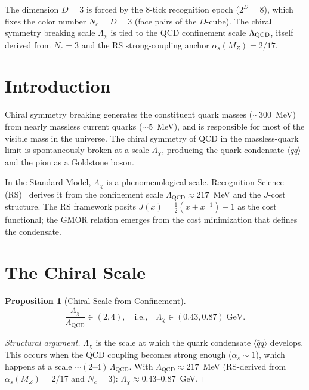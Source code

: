 \documentclass[12pt,a4paper]{article}
\newtheorem{proposition}[theorem]{Proposition}
\theoremstyle{definition}
\theoremstyle{remark}
\begin{document}
\noindent The dimension $D=3$ is forced by the 8-tick recognition
epoch ($2^D=8$), which fixes the color number $N_c=D=3$ (face pairs
of the $D$-cube).  The chiral symmetry breaking scale
$\Lambda_\chi$ is tied to the QCD confinement scale
$\Lambda_{\rm QCD}$, itself derived from $N_c=3$ and the RS
strong-coupling anchor $\alpha_s(M_Z)=2/17$.

\section{Introduction}
\label{sec:intro}

Chiral symmetry breaking generates the constituent quark masses
($\sim 300$~MeV) from nearly massless current quarks ($\sim 5$~MeV),
and is responsible for most of the visible mass in the universe.
The chiral symmetry of QCD in the massless-quark limit is
spontaneously broken at a scale $\Lambda_\chi$, producing the
quark condensate $\langle\bar{q}q\rangle$ and the pion as a
Goldstone boson.

In the Standard Model, $\Lambda_\chi$ is a phenomenological scale.
Recognition Science (RS)~\cite{RS_Axioms} derives it from the
confinement scale $\Lambda_{\mathrm{QCD}} \approx 217$~MeV and the
$J$-cost structure.  The RS framework posits $J(x) = \tfrac{1}{2}(x +
x^{-1}) - 1$ as the cost functional; the GMOR relation emerges from
the cost minimization that defines the condensate.

\section{The Chiral Scale}
\label{sec:chiral-scale}

\begin{proposition}[Chiral Scale from Confinement]
\label{thm:lambda-chi}
\begin{equation}
  \frac{\Lambda_\chi}{\Lambda_{\mathrm{QCD}}} \in (2, 4),
  \quad\text{i.e.,}\quad
  \Lambda_\chi \in (0.43, 0.87)\;\mathrm{GeV}.
\end{equation}
\end{proposition}

\begin{proof}[Structural argument]
$\Lambda_\chi$ is the scale at which the quark condensate
$\langle\bar{q}q\rangle$ develops.  This occurs when the QCD
coupling becomes strong enough ($\alpha_s \sim 1$), which happens
at a scale $\sim (2\text{--}4)\,\Lambda_{\mathrm{QCD}}$.  With
$\Lambda_{\mathrm{QCD}} \approx 217$~MeV (RS-derived from
$\alpha_s(M_Z) = 2/17$ and $N_c = 3$):
$\Lambda_\chi \approx 0.43$--$0.87$~GeV.
\end{proof}
\end{document}
